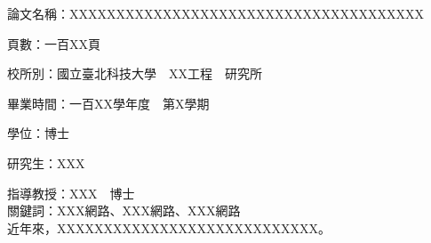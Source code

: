 論文名稱：XXXXXXXXXXXXXXXXXXXXXXXXXXXXXXXXXXXXXX

\noindent 頁數：一百XX頁

\noindent 校所別：國立臺北科技大學　XX工程　研究所

\noindent 畢業時間：一百XX學年度　第X學期

\noindent 學位：博士

\noindent 研究生：XXX

\noindent 指導教授：XXX　博士\\

\noindent 關鍵詞：XXX網路、XXX網路、XXX網路\\

近年來，XXXXXXXXXXXXXXXXXXXXXXXXXXXX。